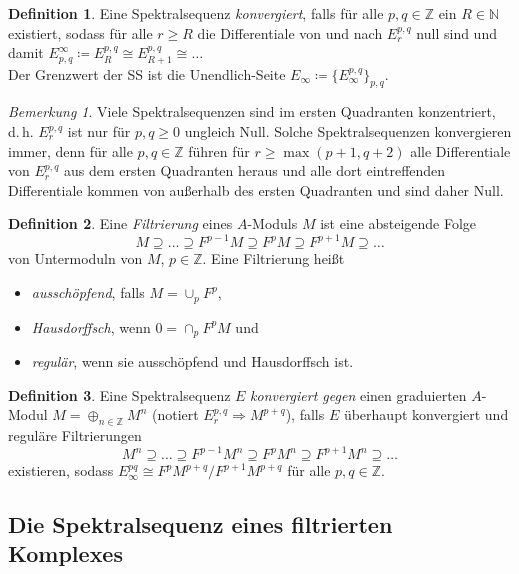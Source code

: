 \documentclass[11pt, a4paper, german]{article}
\theoremstyle{definition}
\newtheorem{defn}{Definition}
\theoremstyle{remark}
\newtheorem*{bem}{Bemerkung}
\newcommand{\N}{\mathbb{N}} %
\newcommand{\Z}{\mathbb{Z}} %
\renewcommand{\dh}{d.\,h.} %
\begin{document}
\begin{defn}
  Eine Spektralsequenz \emph{konvergiert}, falls für alle $p, q \in \Z$ ein $R \in \N$ existiert, sodass für alle $r \geq R$ die Differentiale von und nach $E_r^{p,q}$ null sind und damit $E^\infty_{p,q} \coloneqq E_R^{p,q} \cong E_{R+1}^{p,q} \cong \ldots$ \\[2pt]
  Der Grenzwert der SS ist die Unendlich-Seite $E_\infty \coloneqq \{ E_\infty^{p,q} \}_{p,q}$.
\end{defn}

\begin{bem}
  Viele Spektralsequenzen sind im ersten Quadranten konzentriert, \dh{} $E_r^{p,q}$ ist nur für $p, q \geq 0$ ungleich Null.
  Solche Spektralsequenzen konvergieren immer, denn für alle $p, q \in \Z$ führen für $r \geq \max(p+1, q+2)$ alle Differentiale von $E_r^{p,q}$ aus dem ersten Quadranten heraus und alle dort eintreffenden Differentiale kommen von außerhalb des ersten Quadranten und sind daher Null.
\end{bem}

\begin{defn}
  Eine \emph{Filtrierung} eines $A$-Moduls $M$ ist eine absteigende Folge
  \[ M \supseteq \ldots \supseteq F^{p-1} M \supseteq F^p M \supseteq F^{p+1} M \supseteq \ldots \]
  von Untermoduln von $M$, $p \!\in\! \Z$.
  Eine Filtrierung heißt
  \begin{itemize}
    \item \emph{ausschöpfend}, falls $M = \cup_p F^p$,
    \item \emph{Hausdorffsch}, wenn $0 = \cap_p F^p M$ und
    \item \emph{regulär}, wenn sie ausschöpfend und Hausdorffsch ist.
  \end{itemize}
\end{defn}

\begin{defn}
  Eine Spektralsequenz $E$ \emph{konvergiert gegen} einen graduierten $A$-Modul $M = \oplus_{n \in \Z} M^n$ (notiert $E_r^{p,q} \Rightarrow M^{p+q}$), falls $E$ überhaupt konvergiert und reguläre Filtrierungen
  \[ M^n \supseteq \ldots \supseteq F^{p-1} M^n \supseteq F^p M^n \supseteq F^{p+1} M^n \supseteq \ldots \]
  existieren, sodass $E_\infty^{pq} \cong F^p M^{p+q} / F^{p+1} M^{p+q}$ für alle $p, q \in \Z$.
\end{defn}

\subsection{Die Spektralsequenz eines filtrierten Komplexes}
\end{document}
